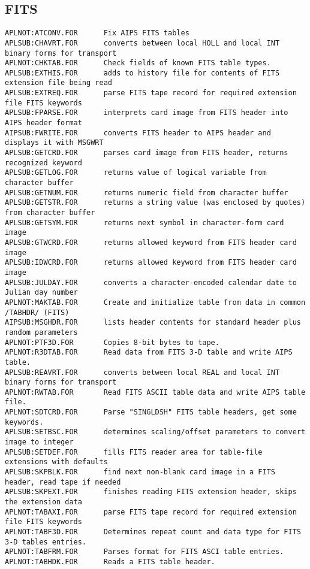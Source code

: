 \subsection{FITS}
\begin{verbatim}
APLNOT:ATCONV.FOR      Fix AIPS FITS tables
APLSUB:CHAVRT.FOR      converts between local HOLL and local INT binary forms for transport
APLNOT:CHKTAB.FOR      Check fields of known FITS table types.
APLSUB:EXTHIS.FOR      adds to history file for contents of FITS extension file being read
APLSUB:EXTREQ.FOR      parse FITS tape record for required extension file FITS keywords
APLSUB:FPARSE.FOR      interprets card image from FITS header into AIPS header format
AIPSUB:FWRITE.FOR      converts FITS header to AIPS header and displays it with MSGWRT
APLSUB:GETCRD.FOR      parses card image from FITS header, returns recognized keyword
APLSUB:GETLOG.FOR      returns value of logical variable from character buffer
APLSUB:GETNUM.FOR      returns numeric field from character buffer
APLSUB:GETSTR.FOR      returns a string value (was enclosed by quotes) from character buffer
APLSUB:GETSYM.FOR      returns next symbol in character-form card image
APLSUB:GTWCRD.FOR      returns allowed keyword from FITS header card image
APLSUB:IDWCRD.FOR      returns allowed keyword from FITS header card image
APLSUB:JULDAY.FOR      converts a character-encoded calendar date to Julian day number
APLNOT:MAKTAB.FOR      Create and initialize table from data in common /TABHDR/ (FITS)
AIPSUB:MSGHDR.FOR      lists header contents for standard header plus random parameters
APLNOT:PTF3D.FOR       Copies 8-bit bytes to tape.
APLNOT:R3DTAB.FOR      Read data from FITS 3-D table and write AIPS table.
APLSUB:REAVRT.FOR      converts between local REAL and local INT binary forms for transport
APLNOT:RWTAB.FOR       Read FITS ASCII table data and write AIPS table file.
APLNOT:SDTCRD.FOR      Parse "SINGLDSH" FITS table headers, get some keywords.
APLSUB:SETBSC.FOR      determines scaling/offset parameters to convert image to integer
APLSUB:SETDEF.FOR      fills FITS reader area for table-file extensions with defaults
APLSUB:SKPBLK.FOR      find next non-blank card image in a FITS header, read tape if needed
APLSUB:SKPEXT.FOR      finishes reading FITS extension header, skips the extension data
APLNOT:TABAXI.FOR      parse FITS tape record for required extension file FITS keywords
APLNOT:TABF3D.FOR      Determines repeat count and data type for FITS 3-D tables entries.
APLNOT:TABFRM.FOR      Parses format for FITS ASCI table entries.
APLNOT:TABHDK.FOR      Reads a FITS table header.

\end{verbatim}

